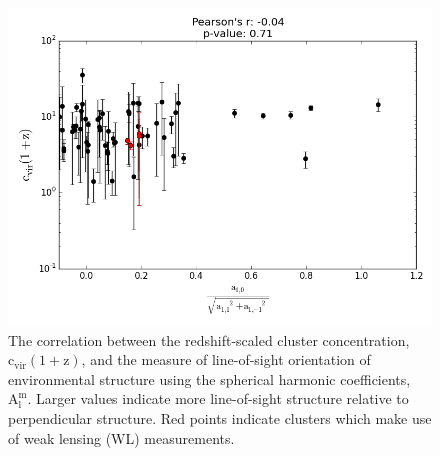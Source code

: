 \begin{figure}
\begin{center}
\includegraphics[width=\textwidth]{images/ClusterEnvironment/ConcRedshift_Corr2.png}
\end{center}
\caption[Redshift Scaled Concentration - $\mathrm{A_{l}^{m}}$ Correlation]{The
  correlation between the redshift-scaled cluster concentration,
  $\mathrm{c_{vir}(1+z)}$, and the measure of line-of-sight orientation of
  environmental structure using the spherical harmonic coefficients,
  $\mathrm{A_{l}^{m}}$. Larger values indicate more line-of-sight structure
  relative to perpendicular structure. Red points indicate clusters
which make use of weak lensing (WL) measurements.}
\end{figure}